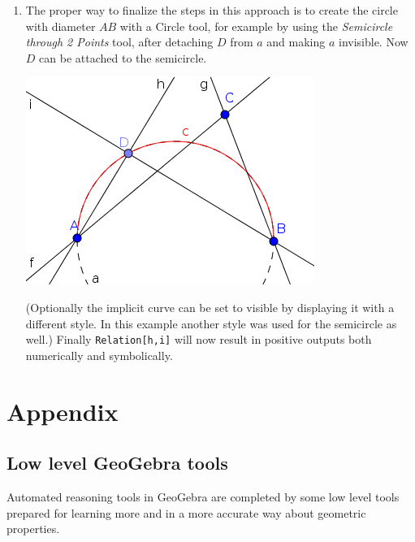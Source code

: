 \documentclass{article}
\begin{document}
\begin{enumerate}
\begin{enumerate}
      \item The proper way to finalize the steps in this approach is to create the circle with diameter $AB$ with a Circle tool, for example by using the \textit{Semicircle through 2 Points} tool, after detaching $D$ from $a$ and making $a$ invisible. Now $D$ can be attached to the semicircle.
\begin{center}
\includegraphics[scale=0.5]{limitations-Thales1-3}
\end{center}
      (Optionally the implicit curve can be set to visible by displaying it with a different style. In this example another style was used for the semicircle as well.) Finally \texttt{Relation[h,i]} will now result in positive outputs both numerically and symbolically.
    \end{enumerate}
\end{enumerate}


\section{Appendix}
\subsection{Low level GeoGebra tools}

Automated reasoning tools in GeoGebra are completed by some low level tools prepared for learning more and in a more accurate way about geometric properties.
\end{document}
